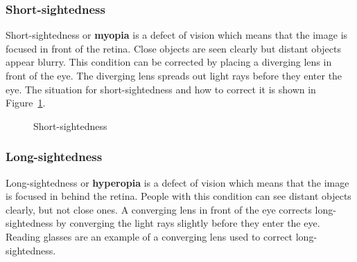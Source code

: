 \subsubsection{Short-sightedness}
Short-sightedness or \textbf{myopia} is a defect of vision which means that the image is focused in front of the retina. Close objects are seen clearly but distant objects appear blurry. This condition can be corrected by placing a diverging lens in front of the eye. The diverging lens spreads out light rays before they enter the eye. The situation for short-sightedness and how to correct it is shown in Figure~\ref{fig:p:wsl:go11:eye:dv:s}.

\begin{figure}[htbp]
\centering
{}
\caption{Short-sightedness}
\label{fig:p:wsl:go11:eye:dv:s}
\end{figure}

\subsubsection{Long-sightedness}
Long-sightedness or \textbf{hyperopia} is a defect of vision which means that the image is focused in behind the retina. People with this condition can see distant objects clearly, but not close ones. A converging lens in front of the eye corrects long-sightedness by converging the light rays slightly before they enter the eye. Reading glasses are an example of a converging lens used to correct long-sightedness.

